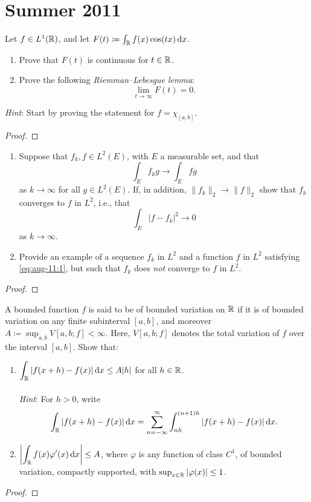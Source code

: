 \section{Summer 2011}
\setcounter{exercise}{0}
\setcounter{equation}{0}
\begin{problem}
Let $f\in L^1(\mathbb{R})$, and let $F(t)\coloneqq\int_{\mathbb{R}} f(x)\cos(tx)\mathop{}\!\mathrm{d} x$.
\begin{enumerate}[label=(\alph*)]
\item Prove that $F(t)$ is continuous for $t\in\mathbb{R}$.
\item Prove the following \emph{Riemman--Lebesgue lemma}:
\[
\lim_{t\to\infty}F(t)=0.
\]
\end{enumerate}
\emph{Hint}: Start by proving the statement for $f=\chi_{[a,b]}$.
\end{problem}
\begin{proof}
\end{proof}

\begin{problem}
\begin{enumerate}[label=(\alph*)]
\item Suppose that $f_k,f\in L^2(E)$, with $E$ a measurable set, and that
\begin{equation}
\label{eq:aug-11:1}
\int_E f_kg\longrightarrow\int_E fg
\end{equation}
as $k\to\infty$ for all $g\in L^2(E)$. If, in addition,
$\|f_k\|_2\to\|f\|_2$ show that $f_k$ converges to $f$ in $L^2$, i.e., that
\[
\int_E|f-f_k|^2\longrightarrow 0
\]
as $k\to\infty$.
\item Provide an example of a sequence $f_k$ in $L^2$ and a function $f$ in
  $L^2$ satisfying \eqref{eq:aug-11:1}, but such that $f_k$ does \emph{not}
  converge to $f$ in $L^2$.
\end{enumerate}
\end{problem}
\begin{proof}
\end{proof}

\begin{problem}
A bounded function $f$ is said to be of bounded variation on $\mathbb{R}$ if it
is of bounded variation on any finite subinterval $[a,b]$, and moreover
$A\coloneqq\sup_{a,b}V[a,b;f]<\infty$. Here, $V[a,b;f]$ denotes the total
variation of $f$ over the interval $[a,b]$. Show that:
\begin{enumerate}[label=(\alph*)]
\item $\displaystyle\int_{\mathbb{R}}|f(x+h)-f(x)|\mathop{}\!\mathrm{d} x\leq A|h|$ for all
  $h\in\mathbb{R}$.
\\\\
\emph{Hint}: For $h>0$, write
\[
\int_{\mathbb{R}} |f(x+h)-f(x)|\mathop{}\!\mathrm{d} x=
\sum_{n=-\infty}^\infty\int_{nh}^{(n+1)h}|f(x+h)-f(x)|\mathop{}\!\mathrm{d} x.
\]
\item $\displaystyle\left|\int_{\mathbb{R}} f(x)\varphi'(x)\mathop{}\!\mathrm{d} x\right|\leq A$,
  where $\varphi$ is any function of class $C^1$, of bounded variation,
  compactly supported, with $\sup_{x\in\mathbb{R}}|\varphi(x)|\leq 1$.
\end{enumerate}
\end{problem}
\begin{proof}
\end{proof}

